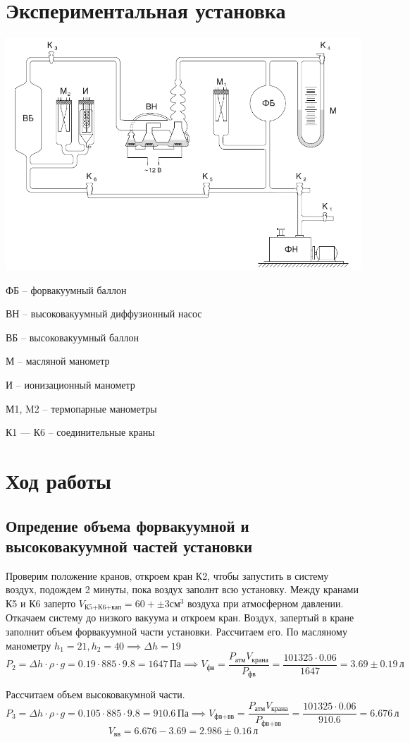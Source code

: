 \documentclass[a4paper,12pt]{article}
\begin{document}
	\section{Экспериментальная установка}
    \includegraphics[width = 0.7\linewidth]{instrument1}
    
    ФБ – форвакуумный баллон
    
    ВН – высоковакуумный диффузионный насос
    
    ВБ – высоковакуумный баллон
   
    М – масляной манометр
   
    И – ионизационный манометр
  
    М1, M2 – термопарные манометры
  
    К1 --- К6 – соединительные краны
    
	
	\section{Ход работы}
	\subsection{Опредение объема форвакуумной и высоковакуумной частей установки}
	Проверим положение кранов, откроем кран К2, чтобы запустить в систему воздух, подождем 2 минуты, пока воздух заполнт всю установку.
	Между кранами К5 и К6 заперто $V_{\text{К5+К6+кап}}=60+\pm 3 \text{см}^3$ воздуха при атмосферном давлении. Откачаем систему до низкого вакуума и откроем кран. Воздух, запертый в кране заполнит объем форвакуумной части установки. Рассчитаем его. По масляному манометру $h_1 = 21, h_2 = 40 \implies\Delta h = 19$
	\[
	P_2 = \Delta h \cdot \rho \cdot g = 0.19\cdot885\cdot9.8 = 1647\, \text{Па} \implies V_{\text{фв}}=\frac{P_{\text{атм}}V_{\text{крана}}}{P_{\text{фв}}} = \frac{101325\cdot 0.06}{1647}=3.69 \pm 0.19 \,\text{л}
	\]
	
	Рассчитаем объем высоковакумной части. 
	\[
	P_3 = \Delta h \cdot \rho \cdot g = 0.105\cdot885\cdot9.8 = 910.6\, \text{Па} \implies V_{\text{фв+вв}}=\frac{P_{\text{атм}}V_{\text{крана}}}{P_{\text{фв+вв}}} = \frac{101325\cdot 0.06}{910.6}=6.676 \,\text{л} 
	\]
	\[ 
	V_{\text{вв}} = 6.676-3.69=2.986\pm0.16\,\text{л}
	\]
	
\end{document}
